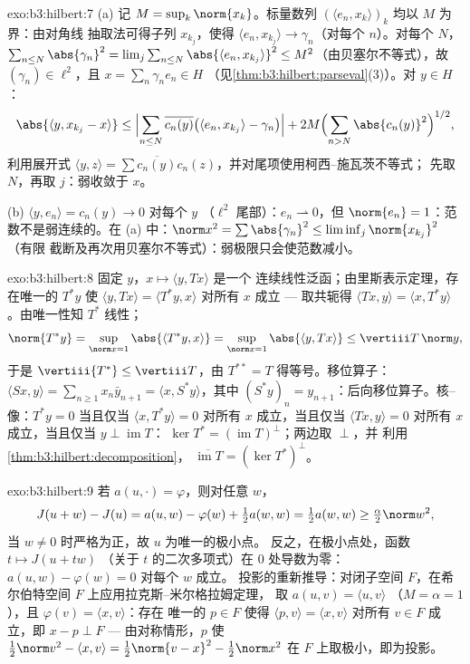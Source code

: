 \begin{solution}{exo:b3:hilbert:7}
(a) 记 $M = \sup_k\norm{x_k}$。标量数列
$(\langle e_n, x_k\rangle)_k$ 均以 $M$ 为界：由对角线
抽取法可得子列 $x_{k_j}$，使得 $\langle e_n, x_{k_j}\rangle
\to \gamma_n$（对每个 $n$）。对每个 $N$，$\sum_{n\leq
N}\abs{\gamma_n}^2 = \lim_j\sum_{n\leq N}\abs{\langle e_n,
x_{k_j}\rangle}^2 \leq M^2$（由贝塞尔不等式），故 $(\gamma_n) \in
\ell^2$，且 $x = \sum_n\gamma_ne_n \in H$
（见\cref{thm:b3:hilbert:parseval}(3)）。对 $y \in H$：
\[
\abs{\langle y, x_{k_j} - x\rangle}
\leq \Bigl|\sum_{n\leq N}\overline{c_n(y)}\bigl(\langle e_n,
x_{k_j}\rangle - \gamma_n\bigr)\Bigr|
+ 2M\Bigl(\sum_{n>N}\abs{c_n(y)}^2\Bigr)^{1/2},
\]
利用展开式 $\langle y, z\rangle =
\sum\overline{c_n(y)}c_n(z)$，并对尾项使用柯西–施瓦茨不等式；
先取 $N$，再取 $j$：弱收敛于 $x$。

(b) $\langle y, e_n\rangle = c_n(y) \to 0$ 对每个 $y$
（$\ell^2$ 尾部）：$e_n \rightharpoonup 0$，但 $\norm{e_n} =
1$：范数不是弱连续的。在 (a) 中：$\norm x^2 =
\sum\abs{\gamma_n}^2 \leq \liminf_j\norm{x_{k_j}}^2$（有限
截断及再次用贝塞尔不等式）：弱极限只会使范数减小。
\end{solution}

\begin{solution}{exo:b3:hilbert:8}
固定 $y$，$x \mapsto \langle y, Tx\rangle$ 是一个
连续线性泛函；由里斯表示定理，存在唯一的 $T^*y$ 使
$\langle y, Tx\rangle = \langle T^*y, x\rangle$ 对所有 $x$ 成立
--- 取共轭得 $\langle Tx, y\rangle = \langle x,
T^*y\rangle$。由唯一性知 $T^*$ 线性；
\[
\norm{T^*y} = \sup_{\norm x = 1}\abs{\langle T^*y, x\rangle}
= \sup_{\norm x=1}\abs{\langle y, Tx\rangle}
\leq \vertiii T\,\norm y,
\]
于是 $\vertiii{T^*} \leq \vertiii T$，由 $T^{**} = T$
得等号。移位算子：$\langle Sx, y\rangle = \sum_{n\geq1}
x_n\bar y_{n+1} = \langle x, S^*y\rangle$，其中 $(S^*y)_n =
y_{n+1}$：后向移位算子。核--像：$T^*y = 0$ 当且仅当
$\langle x, T^*y\rangle = 0$ 对所有 $x$ 成立，当且仅当 $\langle Tx,
y\rangle = 0$ 对所有 $x$ 成立，当且仅当 $y \perp \operatorname{im}T$：
$\ker T^* = (\operatorname{im}T)^\perp$；两边取 $\perp$，并
利用\cref{thm:b3:hilbert:decomposition}，
$\overline{\operatorname{im}T} = (\ker T^*)^\perp$。
\end{solution}

\begin{solution}{exo:b3:hilbert:9}
若 $a(u, \cdot) = \varphi$，则对任意 $w$，
\[
J(u + w) - J(u) = a(u, w) - \varphi(w) + \tfrac12a(w,w)
= \tfrac12a(w,w) \geq \tfrac\alpha2\norm w^2,
\]
当 $w \neq 0$ 时严格为正，故 $u$ 为唯一的极小点。
反之，在极小点处，函数 $t \mapsto J(u + tw)$
（关于 $t$ 的二次多项式）在
$0$ 处导数为零：$a(u, w) - \varphi(w) = 0$ 对每个 $w$ 成立。
投影的重新推导：对闭子空间 $F$，在希尔伯特空间 $F$ 上应用拉克斯–米尔格拉姆定理，
取 $a(u,v) = \langle u, v\rangle$
（$M = \alpha = 1$），且 $\varphi(v) = \langle x, v\rangle$：存在
唯一的 $p \in F$ 使得 $\langle p, v\rangle = \langle x,
v\rangle$ 对所有 $v \in F$ 成立，即 $x - p \perp F$ ---
由对称情形，$p$ 使 $\frac12\norm v^2 - \langle
x, v\rangle = \frac12\norm{v - x}^2 - \frac12\norm x^2$ 在
$F$ 上取极小，即为投影。
\end{solution}

